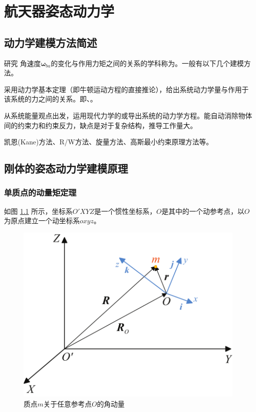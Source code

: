 \chapter{航天器姿态动力学}
\thispagestyle{empty}
\section{动力学建模方法简述}
研究{\color{dy} 角速度$\bm{\omega}_{ba}$的变化与作用力矩之间的关系}的学科称为。一般有以下几个建模方法。
\vspace*{1em}


采用动力学基本定理（即牛顿运动方程的直接推论），给出系统动力学量与作用于该系统的力之间的关系。即、。
\vspace*{1em}



从系统能量观点出发，运用现代力学的或导出系统的动力学方程。能自动消除物体间的约束力和约束反力，缺点是对于复杂结构，推导工作量大。
\vspace*{1em}


\sssection[矢量力学与分析力学的各种变形方法]

凯恩(Kane)方法、R/W方法、旋量方法、高斯最小约束原理方法等。




\section{刚体的姿态动力学建模原理}
\subsection{单质点的动量矩定理}

如图 \ref{单质点角动量} 所示，坐标系$O'XYZ$是一个惯性坐标系，$O$是其中的一个动参考点，以$O$为原点建立一个动坐标系$oxyz$。

\begin{figure}[!htb]
	\centering
	\includegraphics[width=0.4\linewidth]{pic/单质点角动量}
	\vspace*{-1em}
	\caption{质点$m$关于任意参考点$O$的角动量}
	\label{单质点角动量}
\end{figure}

